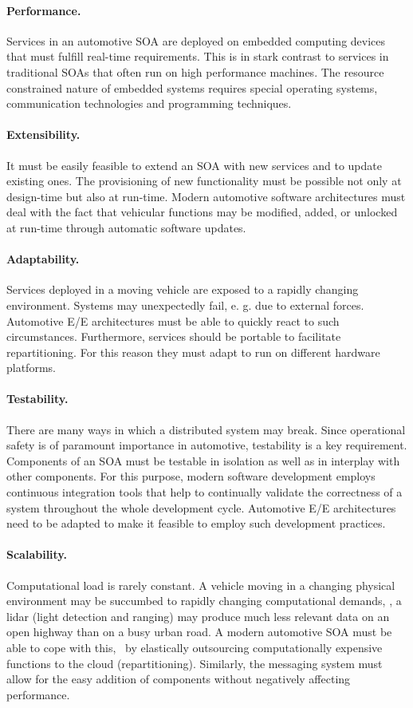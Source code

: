 \paragraph{Performance.}
Services in an automotive SOA are deployed on embedded computing devices that must fulfill real-time requirements. This is in stark contrast to services in traditional SOAs that often run on high performance machines. The resource constrained nature of embedded systems requires special operating systems, communication technologies and programming techniques.

\paragraph{Extensibility.} 
It must be easily feasible to extend an SOA with new services and to update existing ones. The provisioning of new functionality must be possible not only at design-time but also at run-time. Modern automotive software architectures must deal with the fact that vehicular functions may be modified, added, or unlocked at run-time through automatic software updates.

\paragraph{Adaptability.}
Services deployed in a moving vehicle are exposed to a rapidly changing environment. Systems may unexpectedly fail, e. g. due to external forces. Automotive E/E architectures must be able to quickly react to such circumstances. Furthermore, services should be portable to facilitate repartitioning. For this reason they must adapt to run on different hardware platforms.

\paragraph{Testability.}
There are many ways in which a distributed system may break. Since operational safety is of paramount importance in automotive, testability is a key requirement. Components of an SOA must be testable in isolation as well as in interplay with other components. For this purpose, modern software development employs continuous integration tools that help to continually validate the correctness of a system throughout the whole development cycle. Automotive E/E architectures need to be adapted to make it feasible to employ such development practices.


\paragraph{Scalability.}
Computational load is rarely constant. A vehicle moving in a changing physical environment may be succumbed to rapidly changing computational demands, \eg , a lidar (light detection and ranging) may produce much less relevant data on an open highway than on a busy urban road. A modern automotive SOA must be able to cope with this, \eg\ by elastically outsourcing computationally expensive functions to the cloud (repartitioning). Similarly, the messaging system must allow for the easy addition of components without negatively affecting performance.

